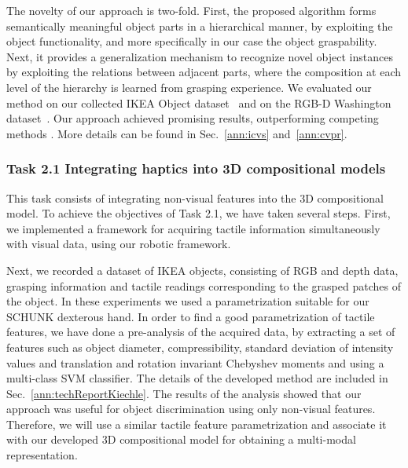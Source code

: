 \documentclass[a4paper,11pt,pdf]{pacmanreport}
\begin{document}
The novelty of our approach is two-fold. First, the proposed algorithm forms semantically meaningful object parts in a hierarchical manner, by exploiting the object functionality, and more specifically in our case the object graspability. Next, it provides a generalization mechanism to recognize novel object instances by exploiting the relations between adjacent parts, where the composition at each level of the hierarchy is learned from grasping experience. We evaluated our method on our collected IKEA Object dataset~\cite{website} and on the RGB-D Washington dataset~\cite{rgbd-dataset}. Our approach achieved promising results, outperforming competing methods \cite{rel7}.
More details can be found in Sec.~\ref{ann:icvs} and~\ref{ann:cvpr}. %


\subsubsection{Task 2.1 Integrating haptics into 3D compositional models}

This task consists of integrating non-visual features into the 3D 
compositional model. 
To achieve the objectives of Task 2.1, we have taken several steps. First, we 
implemented a framework for acquiring tactile information simultaneously with 
visual data, using our robotic framework. 

Next, we recorded a dataset of IKEA objects, consisting of RGB and depth data, 
grasping information and tactile readings corresponding to the grasped patches 
of the object. In these experiments we used a parametrization suitable for our 
SCHUNK dexterous hand. In order to find a good parametrization of tactile features, we 
have done a pre-analysis of the acquired data, by extracting a set of features 
such as object diameter, compressibility, standard deviation of intensity values 
and translation and rotation invariant Chebyshev moments and using a multi-class 
SVM classifier. The details of the developed method are included in Sec.~\ref{ann:techReportKiechle}. The results of the analysis showed that our 
approach was useful for object discrimination using only non-visual features. 
Therefore, we will use a similar tactile feature parametrization and associate 
it with our developed 3D compositional model for obtaining a multi-modal 
representation.
\end{document}
